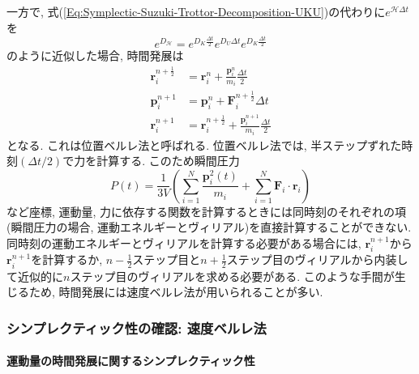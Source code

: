 一方で, 式(\ref{Eq:Symplectic-Suzuki-Trottor-Decomposition-UKU})の代わりに$e^{\mathcal{H} \Delta t}$を
\begin{equation}
  e^{D_{\mathcal{H}}}
  =
  e^{D_{K} \frac{\Delta t}{2}}
  e^{D_{U} \Delta t}
  e^{D_{K} \frac{\Delta t}{2}}
  \label{Eq:Symplectic-Suzuki-Trottor-Decomposition-KUK}
\end{equation}
のように近似した場合, 時間発展は
\begin{align}
  \bm{r}_{i}^{n+\frac{1}{2}}
  &=
  \bm{r}_{i}^{n} + \frac{\bm{p}_{i}^{n}}{m_{i}} \frac{\Delta t}{2}
  \label{Eq:Symplectic-KUK-update-p1}
  \\
  \bm{p}_{i}^{n+1}
  &=
  \bm{p}_{i}^{n} + \bm{F}_{i}^{n + \frac{1}{2}} \Delta t
  \label{Eq:Symplectic-KUK-update-r}
  \\
  \bm{r}_{i}^{n+1}
  &=
  \bm{r}_{i}^{n+\frac{1}{2}} + \frac{\bm{p}_{i}^{n+1}}{m_{i}} \frac{\Delta t}{2}
  \label{Eq:Symplectic-KUK-update-p2}
\end{align}
となる. これは位置ベルレ法と呼ばれる. 
位置ベルレ法では, 半ステップずれた時刻$(\Delta t/2)$で力を計算する. 
このため瞬間圧力
\begin{equation}
  P(t)
  =
  \frac{1}{3V}
  \left(
    \sum_{i=1}^{N} \frac{\bm{p}_{i}^{2}(t)}{m_{i}} +
    \sum_{i=1}^{N} \bm{F}_{i} \cdot \bm{r}_{i}
  \right)
\end{equation}
など座標, 運動量, 力に依存する関数を計算するときには同時刻のそれぞれの項(瞬間圧力の場合, 運動エネルギーとヴィリアル)を直接計算することができない. 
同時刻の運動エネルギーとヴィリアルを計算する必要がある場合には, $\bm{r}_{i}^{n+1}$から$\bm{r}_{i}^{n+1}$を計算するか, $n-\frac{1}{2}$ステップ目と$n + \frac{1}{2}$ステップ目のヴィリアルから内装して近似的に$n$ステップ目のヴィリアルを求める必要がある. このような手間が生じるため, 時間発展には速度ベルレ法が用いられることが多い. 

\subsubsection{シンプレクティック性の確認: 速度ベルレ法}
\paragraph{運動量の時間発展に関するシンプレクティック性}

